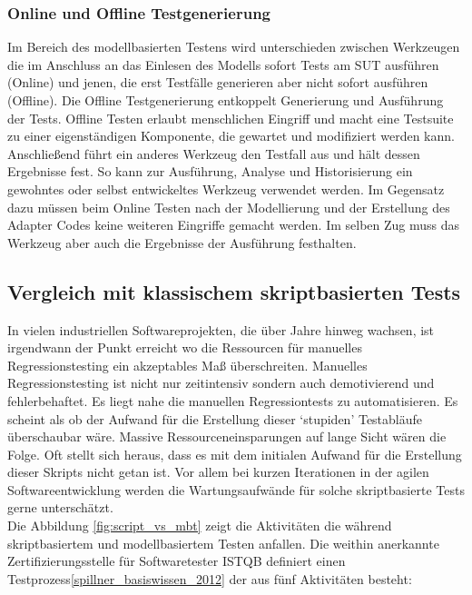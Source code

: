 \subsubsection{Online und Offline Testgenerierung}
\label{sec:online_offline}
Im Bereich des modellbasierten Testens wird unterschieden zwischen Werkzeugen die im Anschluss an das Einlesen des Modells sofort Tests am \gls{SUT} ausführen (Online) und jenen, die erst Testfälle generieren aber nicht sofort ausführen (Offline). Die Offline Testgenerierung entkoppelt Generierung und Ausführung der Tests. Offline Testen erlaubt menschlichen Eingriff und macht eine Testsuite zu einer eigenständigen Komponente, die gewartet und modifiziert werden kann. Anschließend führt ein anderes Werkzeug den Testfall aus und hält dessen Ergebnisse fest. So kann zur Ausführung, Analyse und Historisierung ein gewohntes oder selbst entwickeltes Werkzeug verwendet werden. Im Gegensatz dazu müssen beim Online Testen nach der Modellierung und der Erstellung des Adapter Codes keine weiteren Eingriffe gemacht werden. Im selben Zug muss das Werkzeug aber auch die Ergebnisse der Ausführung festhalten.


\subsection{Vergleich mit klassischem skriptbasierten Tests}
In vielen industriellen Softwareprojekten, die über Jahre hinweg wachsen, ist irgendwann der Punkt erreicht wo die Ressourcen für manuelles Regressionstesting ein akzeptables Maß überschreiten\cite{graham_experiences_2012}. Manuelles Regressionstesting ist nicht nur zeitintensiv sondern auch demotivierend und fehlerbehaftet. Es liegt nahe die manuellen Regressiontests zu automatisieren. Es scheint als ob der Aufwand für die Erstellung dieser `stupiden' Testabläufe überschaubar wäre. Massive Ressourceneinsparungen auf lange Sicht wären die Folge. Oft stellt sich heraus, dass es mit dem initialen Aufwand für die Erstellung dieser Skripts nicht getan ist. Vor allem bei kurzen Iterationen in der agilen Softwareentwicklung werden die Wartungsaufwände für solche skriptbasierte Tests gerne unterschätzt\cite{graham_experiences_2012}.\\
Die Abbildung \ref{fig:script_vs_mbt} zeigt die Aktivitäten die während skriptbasiertem und modellbasiertem Testen anfallen. Die weithin anerkannte Zertifizierungsstelle für Softwaretester \Gls{ISTQB} definiert einen Testprozess\ref{spillner_basiswissen_2012} der aus fünf Aktivitäten besteht: 

